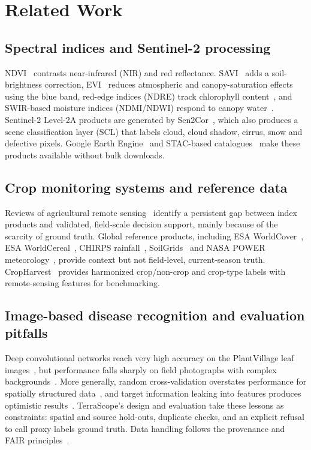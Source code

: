 \documentclass[conference]{IEEEtran}
\begin{document}
\section{Related Work}
\subsection{Spectral indices and Sentinel-2 processing}
NDVI~\cite{rouse1974} contrasts near-infrared (NIR) and red reflectance. SAVI~\cite{huete1988} adds a soil-brightness correction, EVI~\cite{huete2002} reduces atmospheric and canopy-saturation effects using the blue band, red-edge indices (NDRE) track chlorophyll content~\cite{gitelson1994}, and SWIR-based moisture indices (NDMI/NDWI) respond to canopy water~\cite{gao1996}. Sentinel-2 Level-2A products are generated by Sen2Cor~\cite{mainknorn2017}, which also produces a scene classification layer (SCL) that labels cloud, cloud shadow, cirrus, snow and defective pixels. Google Earth Engine~\cite{gorelick2017} and STAC-based catalogues~\cite{stac} make these products available without bulk downloads.

\subsection{Crop monitoring systems and reference data}
Reviews of agricultural remote sensing~\cite{mulla2013,weiss2020} identify a persistent gap between index products and validated, field-scale decision support, mainly because of the scarcity of ground truth. Global reference products, including ESA WorldCover~\cite{zanaga2022}, ESA WorldCereal~\cite{vantricht2023}, CHIRPS rainfall~\cite{funk2015}, SoilGrids~\cite{poggio2021} and NASA POWER meteorology~\cite{nasapower}, provide context but not field-level, current-season truth. CropHarvest~\cite{tseng2021} provides harmonized crop/non-crop and crop-type labels with remote-sensing features for benchmarking.

\subsection{Image-based disease recognition and evaluation pitfalls}
Deep convolutional networks reach very high accuracy on the PlantVillage leaf images~\cite{hughes2015,mohanty2016,ferentinos2018}, but performance falls sharply on field photographs with complex backgrounds~\cite{mohanty2016,barbedo2018}. More generally, random cross-validation overstates performance for spatially structured data~\cite{roberts2017,ploton2020}, and target information leaking into features produces optimistic results~\cite{kaufman2012}. TerraScope's design and evaluation take these lessons as constraints: spatial and source hold-outs, duplicate checks, and an explicit refusal to call proxy labels ground truth. Data handling follows the provenance and FAIR principles~\cite{provdm2013,wilkinson2016}.
\end{document}
